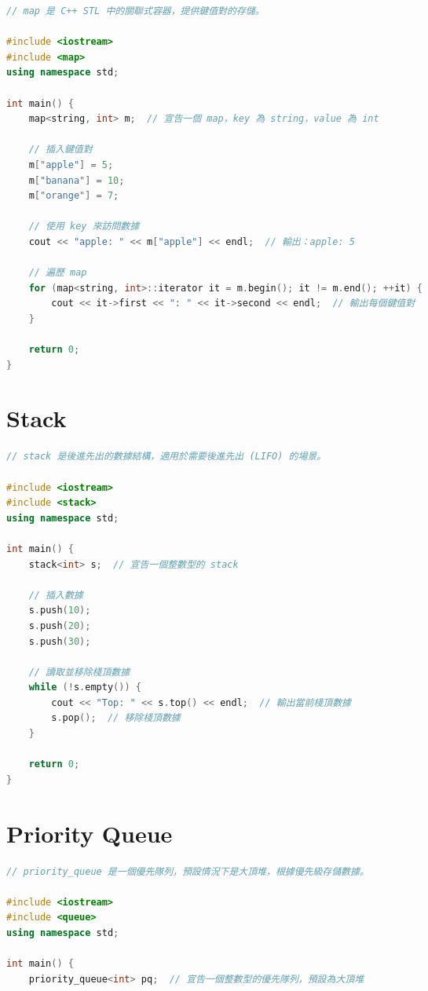 \documentclass{article}
\begin{document}
\begin{multicols}{2}
\begin{lstlisting}[language=C++]
// map 是 C++ STL 中的關聯式容器，提供鍵值對的存儲。

#include <iostream>
#include <map>
using namespace std;

int main() {
    map<string, int> m;  // 宣告一個 map，key 為 string，value 為 int

    // 插入鍵值對
    m["apple"] = 5;
    m["banana"] = 10;
    m["orange"] = 7;

    // 使用 key 來訪問數據
    cout << "apple: " << m["apple"] << endl;  // 輸出：apple: 5

    // 遍歷 map
    for (map<string, int>::iterator it = m.begin(); it != m.end(); ++it) {
        cout << it->first << ": " << it->second << endl;  // 輸出每個鍵值對
    }

    return 0;
}
\end{lstlisting}

\section{Stack}

\begin{lstlisting}[language=C++]
// stack 是後進先出的數據結構，適用於需要後進先出 (LIFO) 的場景。

#include <iostream>
#include <stack>
using namespace std;

int main() {
    stack<int> s;  // 宣告一個整數型的 stack

    // 插入數據
    s.push(10);
    s.push(20);
    s.push(30);

    // 讀取並移除棧頂數據
    while (!s.empty()) {
        cout << "Top: " << s.top() << endl;  // 輸出當前棧頂數據
        s.pop();  // 移除棧頂數據
    }

    return 0;
}
\end{lstlisting}

\section{Priority Queue}

\begin{lstlisting}[language=C++]
// priority_queue 是一個優先隊列，預設情況下是大頂堆，根據優先級存儲數據。

#include <iostream>
#include <queue>
using namespace std;

int main() {
    priority_queue<int> pq;  // 宣告一個整數型的優先隊列，預設為大頂堆


\end{lstlisting}
\end{multicols}
\end{document}

